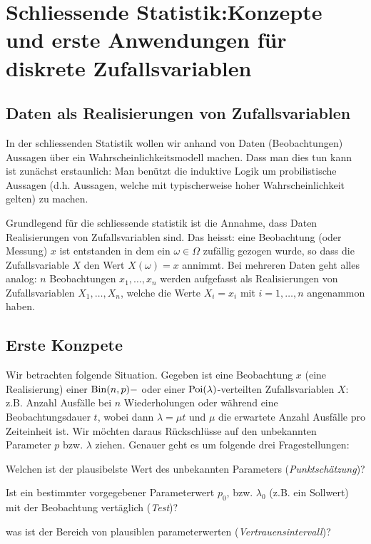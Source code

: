 \chapter{Schliessende Statistik:Konzepte und erste Anwendungen für diskrete Zufallsvariablen}
\section{Daten als Realisierungen von Zufallsvariablen}
\label{sec8.1}
In der schliessenden Statistik wollen wir anhand von Daten (Beobachtungen) Aussagen über ein Wahrscheinlichkeitsmodell machen. Dass man dies tun kann ist zunächst erstaunlich: Man benützt die induktive Logik um probilistische Aussagen (d.h. Aussagen, welche mit typischerweise hoher Wahrscheinlichkeit gelten)  zu machen.

Grundlegend für die schliessende statistik ist die Annahme, dass Daten Realisierungen von Zufallsvariablen sind. Das heisst: eine Beobachtung (oder \glqq Messung\grqq) $x$ ist entstanden in dem ein $\omega\in\Omega$ zufällig gezogen wurde, so dass die Zufallsvariable $X$ den Wert $X(\omega)=x$ annimmt. Bei mehreren Daten geht alles analog: $n$ Beobachtungen $x_1,\ldots,x_n$ werden aufgefasst als Realisierungen von Zufallsvariablen $X_1,\ldots,X_n$, welche die Werte $X_i=x_i$ mit $i=1,\ldots,n$  angenammon haben.
\section{Erste Konzpete}
Wir betrachten folgende Situation. Gegeben ist eine Beobachtung $x$ (eine Realisierung) einer $\operatorname{Bin}(n,p)-$ oder einer  $\operatorname{Poi}(\lambda)$-verteilten Zufallsvariablen $X$: z.B. Anzahl Ausfälle bei $n$ Wiederholungen oder während eine Beobachtungsdauer $t$, wobei dann $\lambda=\mu t$ und $\mu$ die erwartete Anzahl Ausfälle pro Zeiteinheit ist. Wir möchten daraus Rückschlüsse auf den unbekannten Parameter $p$ bzw. $\lambda$ ziehen. Genauer geht es um folgende drei Fragestellungen:
\begin{compactenum}[1.]
	\item Welchen ist der plausibelste Wert des unbekannten Parameters (\emph{Punktschätzung})?
	\item Ist ein bestimmter vorgegebener Parameterwert $p_0$, bzw. $\lambda_0$ (z.B. ein Sollwert) mit der Beobachtung vertäglich (\emph{Test})?
	\item was ist der Bereich von plausiblen parameterwerten (\emph{Vertrauensintervall})?
\end{compactenum}
